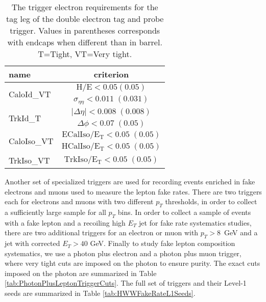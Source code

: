 \begin{table}[htb]
 \caption{The trigger electron requirements for the tag leg of the double electron 
tag and probe trigger. Values in parentheses corresponds with endcaps when 
different than in barrel. T=Tight, VT=Very tight.}
 \label{tab:HLTVeryTightElectronCuts}
 \centering
 \begin{tabular}{|l||c|}
   \hline
   name                       &  criterion \\
   \hline \hline
   \multirow{2}{*}{CaloId\_VT} & $\mathrm{H/E < 0.05 (0.05) }$ \\
                               & $\sigma_{\eta\eta}\mathrm{< 0.011\;(0.031)}$ \\
    \hline
    \multirow{2}{*}{TrkId\_T} & $|\Delta\eta|\mathrm{< 0.008\; (0.008)}$ \\
                               & $\Delta\phi\mathrm{< 0.07\;(0.05)}$  \\
    \hline
    \multirow{2}{*}{CaloIso\_VT} & $\mathrm{ECalIso/E_T <0.05\;(0.05)}$ \\
                                 & $\mathrm{HCalIso/E_T <0.05\;(0.05)}$ \\    
    \hline
    TrkIso\_VT                   & $\mathrm{TrkIso/E_T <0.05\;(0.05)}$ \\

   \hline
 \end{tabular}
\end{table}


Another set of specialized triggers are used for recording events
enriched in fake electrons and muons used to measure the lepton fake 
rates. There are two triggers each for electrons and muons with two 
different $p_{T}$ thresholds, in order to collect a sufficiently 
large sample for all $p_{T}$ bins. In order to collect a sample of
events with a fake lepton and a recoiling high $E_{T}$ jet for 
fake rate systematics studies, there are two additional 
triggers for an electron or muon with $p_{T} > 8$~GeV and a jet
with corrected $E_{T}>40$ GeV. Finally to study fake lepton composition
systematics, we use a photon plus electron and a photon plus muon
trigger, where very tight cuts are imposed on the photon to ensure purity. 
The exact cuts imposed on the photon are summarized in 
Table \ref{tab:PhotonPlusLeptonTriggerCuts}.
The full set of triggers and their Level-1 seeds are summarized in 
Table \ref{tab:HWWFakeRateL1Seeds}. 



